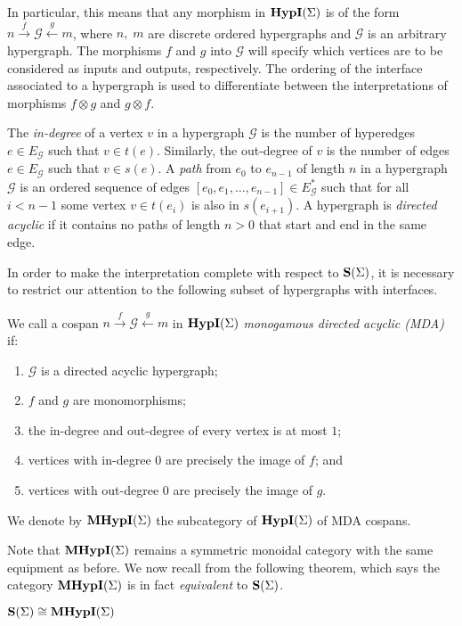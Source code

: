 In particular, this means that any morphism in $\textbf{HypI}(\Sigma)$ is of the form $n \xrightarrow{f} \mathcal{G} \xleftarrow{g} m$,
where $n,\;m$ are discrete ordered hypergraphs and $\mathcal{G}$ is an arbitrary hypergraph.  The morphisms $f$ and $g$ into $\mathcal{G}$ will specify which vertices are to be considered as inputs and outputs,  respectively.
The ordering of the interface associated to a hypergraph is used to differentiate between the interpretations of morphisms $f \otimes g$ and $g \otimes f$.

\begin{definition} 
The \emph{in-degree} of a vertex $v$ in a hypergraph $\mathcal{G}$ is the number of hyperedges $e \in {E_\mathcal{G}}$ such that $v \in t(e)$.  
Similarly, the out-degree of $v$ is the number of edges $e \in E_\mathcal{G}$ such that $v \in s(e)$.
A \emph{path} from $e_0$ to $e_{n-1}$ of length $n$ in a hypergraph $\mathcal{G}$ is an ordered sequence of edges $[e_0, e_1, \ldots, e_{n-1}] \in E_\mathcal{G}^*$ such that for all $i < n - 1$ some vertex $v \in t(e_i)$ is also in $s(e_{i+1})$.
A hypergraph is \emph{directed acyclic} if it contains no paths of length $n > 0$ that start and end in the same edge.
\end{definition}

In order to make the interpretation complete with respect to $\mathbf{S}(\Sigma)$,  it is necessary to restrict our attention to the following subset of hypergraphs with interfaces. 
\begin{definition}
\label{def:monogamy_hyp}
We call a cospan $n \xrightarrow{f} \mathcal{G} \xleftarrow{g} m$ in $\textbf{HypI}(\Sigma)$ \emph{monogamous directed acyclic (MDA)} if:
\begin{enumerate}
    \item $\mathcal{G}$ is a directed acyclic hypergraph;
    \item $f$ and $g$ are monomorphisms;
    \item the in-degree and out-degree of every vertex is at most $1$;
    \item vertices with in-degree $0$ are precisely the image of $f$; and
    \item vertices with out-degree $0$ are precisely the image of $g$.
\end{enumerate}
We denote by $\textbf{MHypI}(\Sigma)$ the subcategory of $\textbf{HypI}(\Sigma)$ of MDA cospans.
\end{definition}
Note that $\textbf{MHypI}(\Sigma)$ remains a symmetric monoidal category with the same equipment as before.  We now recall from
\cite{bonchi_string_2022-2} the following theorem,  which says the category $\textbf{MHypI}(\Sigma)$ is in fact \textit{equivalent} to $\mathbf{S}(\Sigma)$. 
\begin{theorem}\label{thm:prop-equiv}
    $\mathbf{S}(\Sigma) \cong \textbf{MHypI}(\Sigma)$
\end{theorem}

